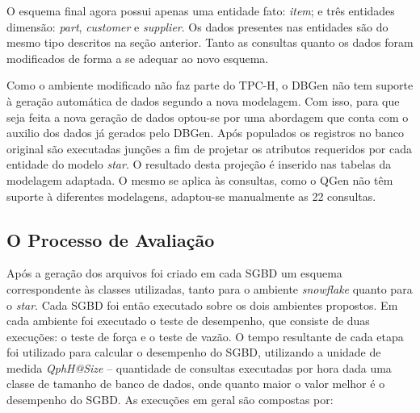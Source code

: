 \documentclass[conference]{IEEEtran}
\begin{document}
O esquema final agora possui apenas uma entidade fato: \textit{item}; e três entidades dimensão: \textit{part}, \textit{customer} e \textit{supplier}. Os dados presentes nas entidades são do mesmo tipo descritos na seção anterior. Tanto as consultas quanto os dados foram modificados de forma a se adequar ao novo esquema.

Como o ambiente modificado não faz parte do TPC-H, o DBGen não tem suporte à geração automática de dados segundo a nova modelagem. Com isso, para que seja feita a nova geração de dados optou-se por uma abordagem que conta com o auxilio dos dados já gerados pelo DBGen. Após populados os registros no banco original são executadas junções a fim de projetar os atributos requeridos por cada entidade do modelo \textit{star}. O resultado desta projeção é inserido nas tabelas da modelagem adaptada. O mesmo se aplica às consultas, como o QGen não têm suporte à diferentes modelagens, adaptou-se manualmente as 22 consultas.

\subsection{O Processo de Avaliação}

Após a geração dos arquivos foi criado em cada SGBD um esquema correspondente às classes utilizadas, tanto para o ambiente \textit{snowflake} quanto para o \textit{star}. Cada SGBD foi então executado sobre os dois ambientes propostos. Em cada ambiente foi executado o teste de desempenho, que consiste de duas execuções: o teste de força e o teste de vazão. O tempo resultante de cada etapa foi utilizado para calcular o desempenho do SGBD, utilizando a unidade de medida \textit{QphH@Size} -- quantidade de consultas executadas por hora dada uma classe de tamanho de banco de dados, onde quanto maior o valor melhor é o desempenho do SGBD. As execuções em geral são compostas por:
\end{document}
